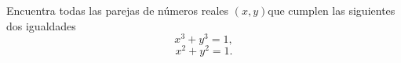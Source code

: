 Encuentra todas las parejas de números reales $(x, y) $que cumplen las siguientes dos igualdades
\[x^3+y^3=1,\]
\[x^2+y^2=1.\]
